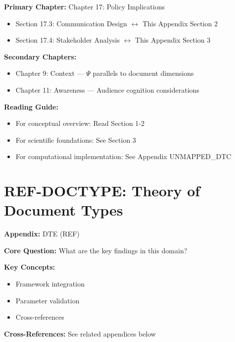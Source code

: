 \begin{tcolorbox}[colback=purple!5!white, colframe=purple!75!black,
    title=Chapter Linkage]

\textbf{Primary Chapter:} Chapter 17: Policy Implications
\begin{itemize}[nosep]
\item Section 17.3: Communication Design $\leftrightarrow$ This Appendix Section 2
\item Section 17.4: Stakeholder Analysis $\leftrightarrow$ This Appendix Section 3
\end{itemize}

\textbf{Secondary Chapters:}
\begin{itemize}[nosep]
\item Chapter 9: Context --- $\Psi$ parallels to document dimensions
\item Chapter 11: Awareness --- Audience cognition considerations
\end{itemize}

\textbf{Reading Guide:}
\begin{itemize}[nosep]
\item For conceptual overview: Read Section 1-2
\item For scientific foundations: See Section 3
\item For computational implementation: See Appendix UNMAPPED_DTC
\end{itemize}

\end{tcolorbox}

\chapter{REF-DOCTYPE: Theory of Document Types}
\label{app:doctype-theory}


\begin{tcolorbox}[colback=blue!5!white, colframe=blue!75!black,
    title=Quick Reference: Appendix UNMAPPED_DTE]

\textbf{Appendix:} DTE (REF)

\textbf{Core Question:} What are the key findings in this domain?

\textbf{Key Concepts:}
\begin{itemize}[nosep]
\item Framework integration
\item Parameter validation
\item Cross-references
\end{itemize}

\textbf{Cross-References:} See related appendices below
\end{tcolorbox}

